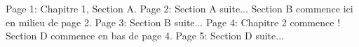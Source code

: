 \documentclass{scrartcl}
\begin{document}
Page 1: Chapitre 1, Section A.
\clearpage
Page 2: Section A suite...
\vspace{10cm}
Section B commence ici en milieu de page 2.
\clearpage
Page 3: Section B suite...
\clearpage
Page 4: Chapitre 2 commence !
\vspace{10cm}
Section D commence en bas de page 4.
\clearpage
Page 5: Section D suite...
\end{document}
